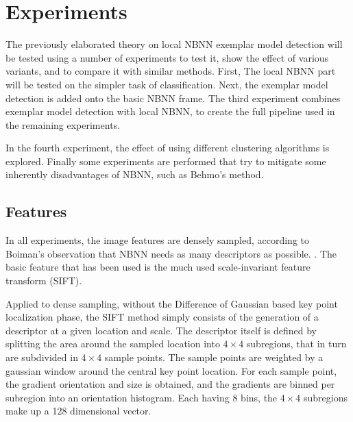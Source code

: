 \section{Experiments} %
\label{cha:experimental_setup}

The previously elaborated theory on local NBNN exemplar model detection will be tested using a number of experiments to test it, show the effect of various variants, and to compare it with similar methods. First, The local NBNN part will be tested on the simpler task of classification. Next, the exemplar model detection is added onto the basic NBNN frame. The third experiment combines exemplar model detection with local NBNN, to create the full pipeline used in the remaining experiments.

In the fourth experiment, the effect of using different clustering algorithms is explored. Finally some experiments are performed that try to mitigate some inherently disadvantages of NBNN, such as Behmo's method\cite{behmo2010towards}.


\subsection{Features} %
\label{sec:features}

In all experiments, the image features are densely sampled, according to Boiman's\cite{boiman2008defense} observation that NBNN needs as many descriptors as possible. .
The basic feature that has been used is the much used scale-invariant feature transform (SIFT).\cite{lowe2004distinctive}

Applied to dense sampling, without the Difference of Gaussian based key point localization phase, the SIFT method simply consists of the generation of a descriptor at a given location and scale. The descriptor itself is defined by splitting the area around the sampled location into $4\times4$ subregions, that in turn are subdivided in $4\times4$ sample points. The sample points are weighted by a gaussian window around the central key point location. For each sample point, the gradient orientation and size is obtained, and the gradients are binned per subregion into an orientation histogram. Each having 8 bins, the $4\times4$ subregions make up a 128 dimensional vector. 

